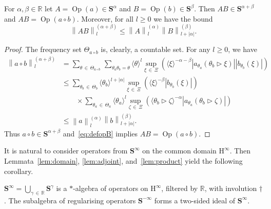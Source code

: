 \documentclass[AHL,Unicode,longabstracts,published]{cedram}
\DeclareMathOperator{\Op}{Op}
\renewcommand{\mathsf}{\mathrm}
\newcommand{\sfH}{\mathsf{H}}
\newcommand{\R}{\mathbb R}
\newcommand{\BS}{\mathbf S}
\newcommand{\act}{\triangleright}
\newcommand{\abs}[1]{\left\lvert #1 \right\rvert}
\newcommand{\snorm}[3]{\left\| #1\right\|_{#3}^{(#2)}}
\newcommand{\ang}[1]{\langle #1 \rangle}
\begin{document}
\begin{lemm}\label{lem:product}
For $\alpha, \beta\in \R$ let $A = \Op(a) \in \BS^{\alpha}$ and $B = \Op(b) \in \BS^{\beta}$. Then $AB\in\BS^{\alpha+\beta}$ and $AB =\Op(a\circ b)$. Moreover, for all $l \ge 0$ we have the bound
\begin{equation}\label{eq:product}
\snorm{AB}{\alpha+\beta}{l} \leq
\snorm{A}{\alpha}{l}\snorm{B}{\beta}{l + \abs{\alpha}}.
\end{equation}
\end{lemm}

\begin{proof}
The frequency set $\Theta_{a\circ b}$ is, clearly, a countable set. For any $l \ge 0$, we have
\begin{equation}
\begin{aligned}
\snorm{a\circ b}{\alpha + \beta}{l} &= \sum_{\theta\,\in\,\Theta_{a\circ b}}
\,\sum_{\theta_a\theta_b = \theta} \ang{\theta}^l
\sup_{\xi\,\in\,\Xi} \left(\ang{\xi}^{-\alpha - \beta}
\abs{a_{\theta_a}(\theta_b\act\xi)}\abs{b_{\theta_b}(\xi)}\right) \\
&\le \sum_{\theta_b\,\in\,\Theta_b} \ang{\theta_b}^{l + \abs{\alpha}}
\sup_{\xi\,\in\,\Xi}\left(\ang{\xi}^{-\beta}
\abs{b_{\theta_b}(\xi)}\right)\\
&\qquad \times \sum_{\theta_a\,\in\,\Theta_a}\ang{\theta_a}^{l}
\sup_{\zeta\,\in\,\Xi}\left(\ang{\theta_b \act \zeta}^{-\alpha}
\abs{a_{\theta_a}(\theta_b \act \zeta)}\right) \\
&\le \snorm{a}{\alpha}{l} \snorm{b}{\beta}{l + \abs{\alpha}}.
\end{aligned}
\end{equation}
Thus $a\circ b\in \BS^{\alpha + \beta}$ and~\eqref{eq:defopB} implies $AB =\Op(a\circ b)$.
\end{proof}

It is natural to consider operators from $\BS^\infty$ on the common domain $\sfH^\infty$. Then Lemmata~\ref{lem:domain}, \ref{lem:adjoint}, and~\ref{lem:product} yield the following corollary.
\begin{coro}
$\BS^\infty=\bigcup_{\gamma\,\in\,\R}\BS^\gamma$ is a $*$-algebra of operators on $\sfH^\infty$, filtered by $\R$, with involution $\dagger$. The subalgebra of regularising operators $\BS^{-\infty}$ forms a two-sided ideal of $\BS^\infty$.
\end{coro}
\end{document}
